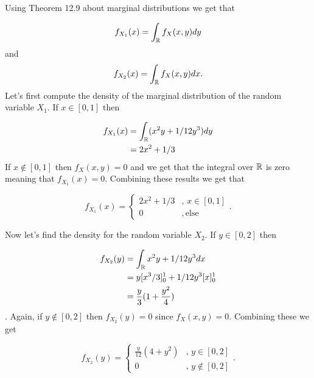 

Using Theorem 12.9 about marginal distributions we get that 

\[
    f_{X_1} (x) = \int_{\mathbb{R}}^{} f_{X} (x,y) dy
\] 
and 
\[
    f_{X_2} (x) = \int_{\mathbb{R}}^{} f_{X} (x,y) dx
.\] 
Let's first compute the density of the marginal distribution of the random variable $ X_1$.
If $ x \in [0,1]$ then

\begin{align*}
    f_{X_1} (x) &= \int_{\mathbb{R}}^{} (x^2y + 1/12 y^{3} )dy \\
		&= 2x^2 + 1/3
\end{align*}
If $ x \notin [0,1]$ then $ f_{X} (x,y) = 0$ and we get that the integral over $ \mathbb{R}$ is zero meaning
that $ f_{X_{1} } (x) = 0$.
Combining these results we get that 

\[
    f_{X_1} (x) = \begin{cases}
	2x^2 + 1/3 &, \, x \in [0,1]\\ 
	0 &, \, \mbox{else} 
    \end{cases}
.\] 

Now let's find the density for the random variable $ X_2$.
If $ y \in [0,2]$ then

\begin{align*}
    f_{X_2} (y) &= \int_{\mathbb{R}}^{} x^2y + 1/12 y^{3} dx \\
		&= y [x^{3}/3]_{0}^{1} + 1/12 y^{3}[x]_{0}^{1} \\
		&= \frac{y}{3} (1+ \frac{y^2}{4} )
\end{align*}.
Again, if $ y \notin [0,2]$ then $ f_{X_2}(y) = 0$ since $ f_{X}(x,y) = 0$.
Combining these we get

\[
    f_{X_2} (y ) = \begin{cases}
	\frac{y}{12} (4 + y^2) &, \, y \in [0,2]\\
	0 &, \, y \notin [0,2]
    \end{cases}
.\] 
